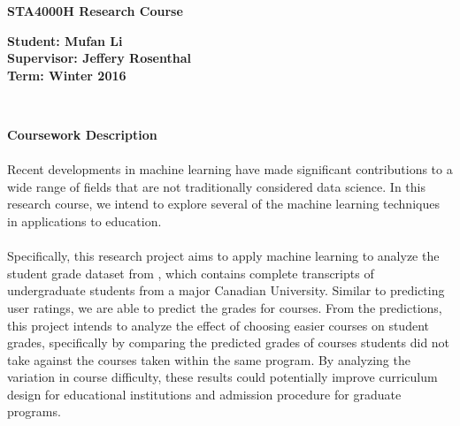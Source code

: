 \documentclass[11pt]{article}
\newcommand{\handout}[5]{
  \noindent
  \begin{center}
  \framebox{
    \vbox{
      \hbox to 5.78in { {\bf STA4516: Topics in 
        Probabilistic Programming } \hfill #2 }
      \vspace{4mm}
      \hbox to 5.78in { {\Large \hfill #5  \hfill} }
      \vspace{2mm}
      \hbox to 5.78in { {\em #3 \hfill #4} }
    }
  }
  \end{center}
  \vspace*{4mm}
}
\newcommand{\lecture}[4]{\handout{#1}{#2}{#3}{Scribe: #4}{Lecture #1}}
\begin{document}

\begin{center}

\begin{LARGE}
	\textbf{STA4000H Research Course} 
\end{LARGE}

\begin{large}
	\textbf{Student: Mufan Li\\
		Supervisor: Jeffery Rosenthal\\
		Term: Winter 2016}
\end{large}\\

\end{center}

\begin{Large}
	\textbf{Coursework Description}
\end{Large}

\paragraph{}
Recent developments in machine learning have made significant 
contributions to a wide range of fields that are not 
traditionally considered data science.
In this research course, we intend to explore several of the 
machine learning techniques in applications to education.

\paragraph{}
Specifically, this research project aims to apply machine learning 
to analyze the student grade dataset from \cite{BaRoYo14},
which contains complete transcripts of undergraduate students
from a major Canadian University.
Similar to predicting user ratings,
we are able to predict the grades for courses.
From the predictions, this project intends to analyze
the effect of choosing easier courses on student grades,
specifically by comparing the predicted grades of courses
students did not take against the courses taken 
within the same program.
By analyzing the variation in course difficulty,
these results could potentially improve curriculum design 
for educational institutions and admission procedure for
graduate programs.
\end{document}
